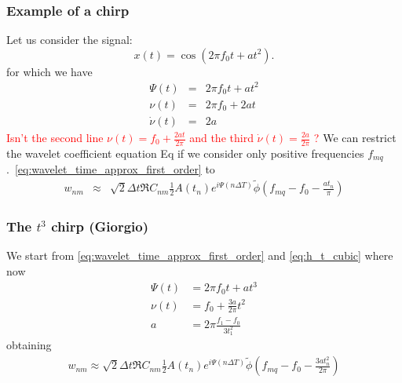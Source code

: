 \documentclass{article}
\begin{document}
\subsubsection{Example of a chirp}
Let us consider the signal:
\begin{equation}
    x(t) = \cos\left( 2 \pi f_0 t + a t^{2} \right).
\end{equation}
for which we have 
\begin{eqnarray}
    \Psi(t) & = & 2 \pi f_0 t + a t^{2} \nonumber \\
    \nu(t) & = & 2 \pi f_0 + 2 a t \nonumber \\
    \dot{\nu}(t) & = & 2a
\end{eqnarray}
\textcolor{red}{Isn't the second line $\nu(t) = f_0 + \frac{2 a t}{2 \pi}$ and the third $\dot\nu(t) =\frac{2 a}{2 \pi}$ ?}
We can restrict the wavelet coefficient equation Eq if we consider only positive frequencies $f_{mq}$.~\eqref{eq:wavelet_time_approx_first_order} to
\begin{eqnarray}
\label{eq:wavelet_time_approx_first_order_tsquared}
    w_{n m} & \approx & \sqrt{2} \Delta t \Re C_{n m} \frac{1}{2} A(t_n) e^{i\Psi(n\Delta T)} \tilde{\phi}\left( f_{mq} - f_0 - \frac{a t_n}{\pi} \right)
\end{eqnarray}

\subsubsection{The $t^3$ chirp (Giorgio)}
We start from \eqref{eq:wavelet_time_approx_first_order} and \eqref{eq:h_t_cubic} where now
%
\begin{align}
    \Psi(t) &= 2 \pi f_0 t + a t^{3}\nonumber\\
    \nu(t) &= f_0 + \frac{3 a}{2\pi} t^2\nonumber\\
    a&=2\pi \frac{f_1-f_0}{3t_1^2}
\end{align}
%
obtaining
%
\begin{align}
\label{eq:wavelet_time_approx_first_order_tcube}
w_{n m} \approx \sqrt{2} \Delta t \Re C_{n m} \frac{1}{2} A(t_n) e^{i\Psi(n\Delta T)} \tilde{\phi}\left( f_{mq} - f_0 - \frac{3a t_n^2}{2\pi} \right)
\end{align}
\end{document}
